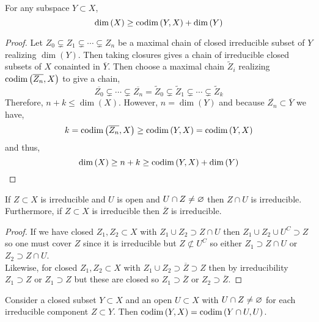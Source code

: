 \documentclass[12pt]{article}
\begin{document}
\begin{prop}
For any subspace $Y \subset X$,
\[ \dim{(X)} \ge \mathrm{codim}\left( Y, X \right) + \dim{(Y)} \]
\end{prop}

\begin{proof}
Let $Z_0 \subsetneq Z_1 \subsetneq \cdots \subsetneq Z_n$ be a maximal chain of closed irreducible subset of $Y$ realizing $\dim{(Y)}$. Then taking closures gives a chain of irreducible closed subsets of $X$ conainted in $\overline{Y}$. Then choose a maximal chain $\tilde{Z}_i$ realizing $\mathrm{codim}\left( \overline{Z_n}, X \right)$ to give a chain,
\[ \overline{Z_0} \subsetneq \cdots \subsetneq \overline{Z_n} = \tilde{Z}_0 \subsetneq \tilde{Z}_1 \subsetneq \cdots \subsetneq \tilde{Z}_k \]
Therefore, $n + k \le \dim{(X)}$. However, $n = \dim{(Y)}$ and because $\overline{Z_n} \subset \overline{Y}$ we have,
\[ k = \mathrm{codim}\left( \overline{Z_n}, X \right) \ge \mathrm{codim}\left( Y, X \right) = \mathrm{codim}\left( Y, X \right) \]
and thus,
\[ \dim{(X)} \ge n + k \ge \mathrm{codim}\left( Y, X \right) + \dim{(Y)} \]
\end{proof}

\begin{lemma}
If $Z \subset X$ is irreducible and $U$ is open and $U \cap Z \neq \varnothing$ then $Z \cap U$ is irreducible. Furthermore, if $Z \subset X$ is irreducible then $\overline{Z}$ is irreducible.
\end{lemma}

\begin{proof}
If we have closed $Z_1, Z_2 \subset X$ with $Z_1 \cup Z_2 \supset Z \cap U$ then $Z_1 \cup Z_2 \cup U^C \supset Z$ so one must cover $Z$ since it is irreducible but $Z \not\subset U^C$ so either $Z_1 \supset Z \cap U$ or $Z_2 \supset Z \cap U$.
\bigskip\\
Likewise, for closed $Z_1, Z_2 \subset X$ with $Z_1 \cup Z_2 \supset \overline{Z} \supset Z$ then by irreducibility $Z_1 \supset Z$ or $Z_1 \supset Z$ but these are closed so $Z_1 \supset \overline{Z}$ or $Z_2 \supset \overline{Z}$. 
\end{proof}

\begin{lemma} \label{codimension_opens}
Consider a closed subset $Y \subset X$ and an open $U \subset X$ with $U \cap Z \neq \varnothing$ for each irreducible component $Z \subset Y$. Then $\mathrm{codim}\left( Y, X \right) = \mathrm{codim}\left( Y \cap U, U \right)$. 
\end{lemma}
\end{document}
